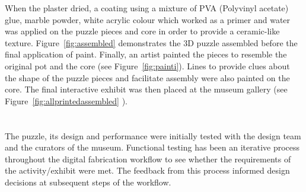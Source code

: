 \documentclass[acmlarge,screen,dvipsnames]{acmart}
\begin{document}
When the plaster dried, a coating using a mixture of PVA (Polyvinyl
acetate) glue, marble powder, white acrylic colour which worked as a
primer and water was applied on the puzzle pieces and core in order to
provide a ceramic-like texture. Figure~\ref{fig:assembled}
demonstrates the 3D puzzle assembled before the final application of
paint. Finally, an artist painted the pieces to resemble the original
pot and the core (see Figure~\ref{fig:painti}). Lines to provide clues
about the shape of the puzzle pieces and facilitate assembly were also
painted on the core. The final interactive exhibit was then placed at
the museum gallery (see Figure~\ref{fig:allprintedassembled} ).

\section{}
\label{eva}

The puzzle, its design and performance were initially tested with the
design team and the curators of the museum. Functional testing has
been an iterative process throughout the digital fabrication workflow
to see whether the requirements of the activity/exhibit were met. The
feedback from this process informed design decisions at subsequent
steps of the workflow.
\end{document}
